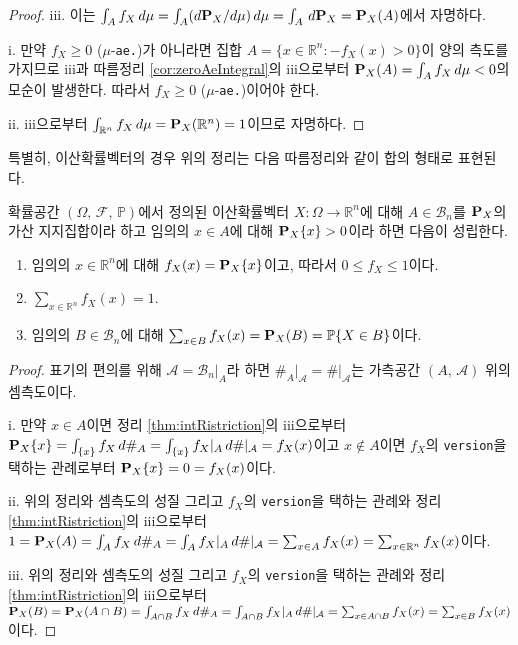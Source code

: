 \begin{proof}
    iii. 이는 $\int_Af_X\,d\mu=\int_A(d\mathbf{P}_X/d\mu)\,d\mu=\int_A\,d\mathbf{P}_X=\mathbf{P}_X(A)$에서 자명하다.

    i. 만약 $f_X\geq0$ ($\mu$-\texttt{ae.})가 아니라면 집합 $A=\{x\in\mathbb{R}^n:-f_X(x)>0\}$이 양의 측도를 가지므로 iii과 따름정리 \ref{cor:zeroAeIntegral}의 iii으로부터 $\mathbf{P}_X(A)=\int_Af_X\,d\mu<0$의 모순이 발생한다. 따라서 $f_X\geq0$ ($\mu$-\texttt{ae.})이어야 한다.
    
    ii. iii으로부터 $\int_{\mathbb{R}^n}f_X\,d\mu=\mathbf{P}_X(\mathbb{R}^n)=1$이므로 자명하다.
\end{proof}

특별히, 이산확률벡터의 경우 위의 정리는 다음 따름정리와 같이 합의 형태로 표현된다.

\begin{corollary}
    확률공간 $(\Omega,\,\mathcal{F},\,\mathbb{P})$에서 정의된 이산확률벡터 $X:\Omega\to\mathbb{R}^n$에 대해 $A\in\mathcal{B}_n$를 $\mathbf{P}_X$의 가산 지지집합이라 하고 임의의 $x\in A$에 대해 $\mathbf{P}_X\{x\}>0$이라 하면 다음이 성립한다.
    \begin{enumerate}
        \item 임의의 $x\in\mathbb{R}^n$에 대해 $f_X(x)=\mathbf{P}_X\{x\}$이고, 따라서 $0\leq f_X\leq1$이다.
        \item $\sum_{x\in\mathbb{R}^n}f_X(x)=1$.
        \item 임의의 $B\in\mathcal{B}_n$에 대해 $\sum_{x\in B}f_X(x)=\mathbf{P}_X(B)=\mathbb{P}\{X\in B\}$이다.
    \end{enumerate}
\end{corollary}

\begin{proof}
    표기의 편의를 위해 $\mathcal{A}=\mathcal{B}_n\vert_A$라 하면 $\#_A\vert_\mathcal{A}=\#\vert_\mathcal{A}$는 가측공간 $(A,\,\mathcal{A})$ 위의 셈측도이다.

    i. 만약 $x\in A$이면 정리 \ref{thm:intRistriction}의 iii으로부터 $\mathbf{P}_X\{x\}=\int_{\{x\}}f_X\,d\#_A=\int_{\{x\}}f_X\vert_A\,d\#\vert_\mathcal{A}=f_X(x)$이고 $x\notin A$이면 $f_X$의 \texttt{version}을 택하는 관례로부터 $\mathbf{P}_X\{x\}=0=f_X(x)$이다.

    ii. 위의 정리와 셈측도의 성질 그리고 $f_X$의 \texttt{version}을 택하는 관례와 정리 \ref{thm:intRistriction}의 iii으로부터 $1=\mathbf{P}_X(A)=\int_Af_X\,d\#_A=\int_Af_X\vert_A\,d\#\vert_\mathcal{A}=\sum_{x\in A}f_X(x)=\sum_{x\in\mathbb{R}^n}f_X(x)$이다.

    iii. 위의 정리와 셈측도의 성질 그리고 $f_X$의 \texttt{version}을 택하는 관례와 정리 \ref{thm:intRistriction}의 iii으로부터 $\mathbf{P}_X(B)=\mathbf{P}_X(A\cap B)=\int_{A\cap B}f_X\,d\#_A=\int_{A\cap B}f_X\vert_A\,d\#\vert_\mathcal{A}=\sum_{x\in A\cap B}f_X(x)=\sum_{x\in B}f_X(x)$이다.
\end{proof}

